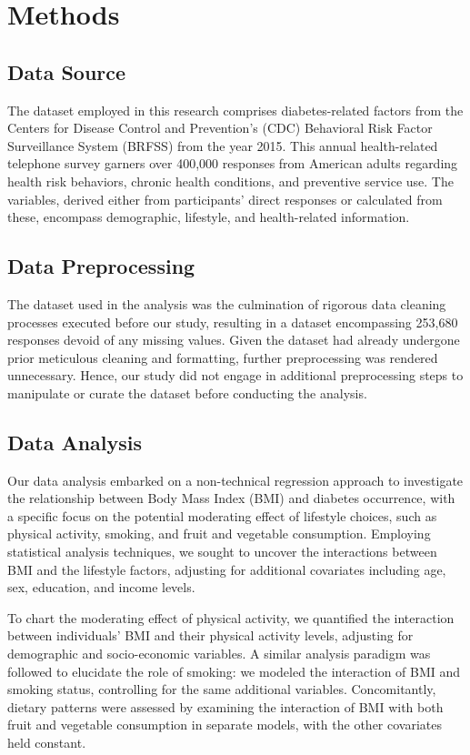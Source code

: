 \documentclass[11pt]{article}
\begin{document}
\section*{Methods}

\subsection*{Data Source}
The dataset employed in this research comprises diabetes-related factors from the Centers for Disease Control and Prevention's (CDC) Behavioral Risk Factor Surveillance System (BRFSS) from the year 2015. This annual health-related telephone survey garners over 400,000 responses from American adults regarding health risk behaviors, chronic health conditions, and preventive service use. The variables, derived either from participants' direct responses or calculated from these, encompass demographic, lifestyle, and health-related information.

\subsection*{Data Preprocessing}
The dataset used in the analysis was the culmination of rigorous data cleaning processes executed before our study, resulting in a dataset encompassing 253,680 responses devoid of any missing values. Given the dataset had already undergone prior meticulous cleaning and formatting, further preprocessing was rendered unnecessary. Hence, our study did not engage in additional preprocessing steps to manipulate or curate the dataset before conducting the analysis.

\subsection*{Data Analysis}
Our data analysis embarked on a non-technical regression approach to investigate the relationship between Body Mass Index (BMI) and diabetes occurrence, with a specific focus on the potential moderating effect of lifestyle choices, such as physical activity, smoking, and fruit and vegetable consumption. Employing statistical analysis techniques, we sought to uncover the interactions between BMI and the lifestyle factors, adjusting for additional covariates including age, sex, education, and income levels.

To chart the moderating effect of physical activity, we quantified the interaction between individuals' BMI and their physical activity levels, adjusting for demographic and socio-economic variables. A similar analysis paradigm was followed to elucidate the role of smoking: we modeled the interaction of BMI and smoking status, controlling for the same additional variables. Concomitantly, dietary patterns were assessed by examining the interaction of BMI with both fruit and vegetable consumption in separate models, with the other covariates held constant.
\end{document}

